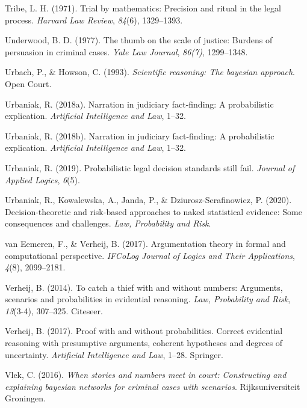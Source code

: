 \documentclass[11pt,dvipsnames,enabledeprecatedfontcommands]{scrartcl}
\begin{document}
\leavevmode\hypertarget{ref-tribe71}{}%
Tribe, L. H. (1971). Trial by mathematics: Precision and ritual in the
legal process. \emph{Harvard Law Review}, \emph{84}(6), 1329--1393.

\leavevmode\hypertarget{ref-Underwood1977The-thumb-on-th}{}%
Underwood, B. D. (1977). The thumb on the scale of justice: Burdens of
persuasion in criminal cases. \emph{Yale Law Journal}, \emph{86(7)},
1299--1348.

\leavevmode\hypertarget{ref-Urbach1993-HOWSRT}{}%
Urbach, P., \& Howson, C. (1993). \emph{Scientific reasoning: The
bayesian approach}. Open Court.

\leavevmode\hypertarget{ref-urbaniak2018narration}{}%
Urbaniak, R. (2018a). Narration in judiciary fact-finding: A
probabilistic explication. \emph{Artificial Intelligence and Law},
1--32.

\leavevmode\hypertarget{ref-Urbaniak2017Narration-in-ju}{}%
Urbaniak, R. (2018b). Narration in judiciary fact-finding: A
probabilistic explication. \emph{Artificial Intelligence and Law},
1--32.

\leavevmode\hypertarget{ref-Urbaniak2019standards2}{}%
Urbaniak, R. (2019). Probabilistic legal decision standards still fail.
\emph{Journal of Applied Logics}, \emph{6}(5).

\leavevmode\hypertarget{ref-Urbaniak2020Decision}{}%
Urbaniak, R., Kowalewska, A., Janda, P., \& Dziurosz-Serafinowicz, P.
(2020). Decision-theoretic and risk-based approaches to naked
statistical evidence: Some consequences and challenges. \emph{Law,
Probability and Risk}.

\leavevmode\hypertarget{ref-vanEemeren2017}{}%
van Eemeren, F., \& Verheij, B. (2017). Argumentation theory in formal
and computational perspective. \emph{IFCoLog Journal of Logics and Their
Applications}, \emph{4}(8), 2099--2181.

\leavevmode\hypertarget{ref-verheij2014catch}{}%
Verheij, B. (2014). To catch a thief with and without numbers:
Arguments, scenarios and probabilities in evidential reasoning.
\emph{Law, Probability and Risk}, \emph{13}(3-4), 307--325. Citeseer.

\leavevmode\hypertarget{ref-verheijproof2017}{}%
Verheij, B. (2017). Proof with and without probabilities. Correct
evidential reasoning with presumptive arguments, coherent hypotheses and
degrees of uncertainty. \emph{Artificial Intelligence and Law}, 1--28.
Springer.

\leavevmode\hypertarget{ref-vlek2016stories}{}%
Vlek, C. (2016). \emph{When stories and numbers meet in court:
Constructing and explaining bayesian networks for criminal cases with
scenarios}. Rijksuniversiteit Groningen.
\end{document}

